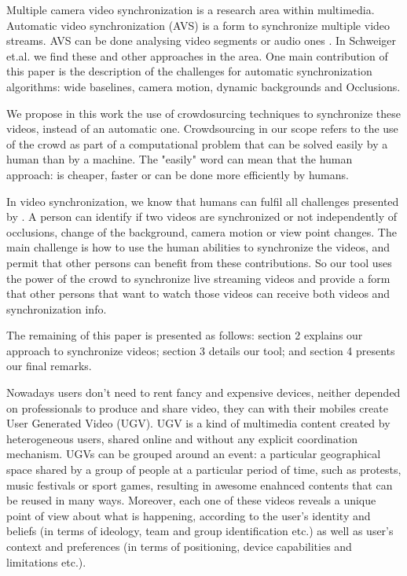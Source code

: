Multiple camera video synchronization is a research area within multimedia. Automatic video synchronization (AVS) is a form to synchronize multiple video streams. AVS can be done analysing video segments \cite{wang2014videosnapping} or audio ones \cite{su2012making}. In Schweiger et.al.\cite{schweiger2013fully} we find these and other approaches in the area. One main contribution of this paper is the description of the challenges for automatic synchronization algorithms: wide baselines, camera motion, dynamic backgrounds and Occlusions.

We propose in this work the use of crowdosurcing techniques to synchronize these videos, instead of an automatic one. Crowdsourcing \cite{howe2006rise} in our scope refers to the use of the crowd as part of a computational problem that can be solved easily by a human than by a machine. The "easily" word can mean that the human approach: is cheaper, faster or can be done more efficiently by humans.

In video synchronization, we know that humans can fulfil all challenges presented by \cite{schweiger2013fully}. A person can identify if two videos are synchronized or not independently of occlusions, change of the background, camera motion or view point changes. The main challenge is how to use the human abilities to synchronize the videos, and permit that other persons can benefit from these contributions. So our tool uses the power of the crowd to synchronize live streaming videos and provide a form that other persons that want to watch those videos can receive both videos and synchronization info.

The remaining of this paper is presented as follows: section 2 explains our approach to synchronize videos; section 3 details our tool; and section 4 presents our final remarks.



Nowadays users don't need to rent fancy and expensive devices, neither depended on professionals to produce and share video, they can with their mobiles create User Generated Video (UGV). UGV is a kind of multimedia content created by heterogeneous users, shared online and without any explicit coordination mechanism. UGVs can be grouped around an event: a particular geographical space shared by a group of people at a particular period of time, such as protests, music festivals or sport games, resulting in awesome enahnced contents that can be reused in many ways. Moreover, each one of these videos reveals a unique point of view about what is happening, according to the user's identity and beliefs (in terms of ideology, team and group identification etc.) as well as user's context and preferences (in terms of positioning, device capabilities and limitations etc.). 


